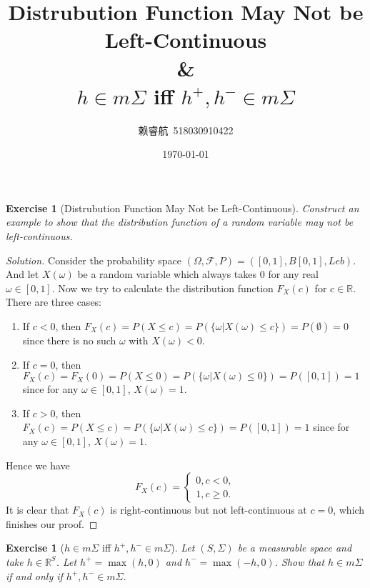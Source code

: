 \documentclass[a4paper, linespread=1.5]{article}
\newtheorem{exercise}[theorem]{Exercise}
\newcommand{\Real}{\mathbb{R}}
\begin{document}
    \title{Distrubution Function May Not be Left-Continuous\\\&\\$h\in m\Sigma$ iff $h^+, h^- \in m\Sigma$}
    \author{赖睿航\ 518030910422}
    \date{\today}
    \maketitle

    \begin{exercise}[Distrubution Function May Not be Left-Continuous]
        Construct an example to show that the distribution function of a random variable may not be left-continuous.
    \end{exercise}

    \begin{proof}[Solution]
        Consider the probability space $(\Omega, \mathcal{F}, P) = ([0, 1], B[0, 1], Leb)$. And let $X(\omega)$ be a random variable which always takes $0$ for any real $\omega \in [0, 1]$. Now we try to calculate the distribution function $F_X(c)$ for $c \in \Real$. There are three cases:
        
        \begin{enumerate}
            \item If $c < 0$, then $F_X(c) = P(X \leqslant c) = P(\{\omega | X(\omega) \leqslant c\}) = P(\emptyset) = 0$ since there is no such $\omega$ with $X(\omega) < 0$.
            \item If $c = 0$, then $F_X(c) = F_X(0) = P(X \leqslant 0) = P(\{\omega | X(\omega) \leqslant 0\}) = P([0, 1]) = 1$ since for any $\omega \in [0, 1]$, $X(\omega) = 1$.
            \item If $c > 0$, then $F_X(c) = P(X \leqslant c) = P(\{\omega | X(\omega) \leqslant c\}) = P([0, 1]) = 1$ since for any $\omega \in [0, 1]$, $X(\omega) = 1$.
        \end{enumerate}
        
        Hence we have
        $$
        F_X(c) = \left\{
        \begin{aligned}
            0, c < 0, \\
            1, c \geqslant 0.
        \end{aligned}
        \right.
        $$
        It is clear that $F_X(c)$ is right-continuous but not left-continuous at $c = 0$, which finishes our proof.
    \end{proof}
    \vspace{5mm}
    
    \begin{exercise}[$h\in m\Sigma$ iff $h^+, h^- \in m\Sigma$]
        Let $(S, \Sigma)$ be a measurable space and take $h \in \Real^S$. Let $h^+ = \max(h, 0)$ and $h^- = \max(-h, 0)$. Show that $h \in m\Sigma$ if and only if $h^+, h^- \in m\Sigma$.
    \end{exercise}
\end{document}
